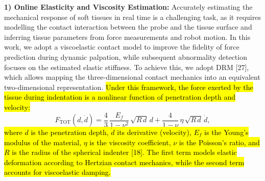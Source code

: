\documentclass[11pt]{article}
\begin{document}
\textbf{1) Online Elasticity and Viscosity Estimation:} Accurately
estimating the mechanical response of soft tissues in real time is a
challenging task, as it requires modelling the contact interaction
between the probe and the tissue surface and inferring tissue
parameters from force measurements and robot motion. In this work,
we adopt a viscoelastic contact model to improve the fidelity of
force prediction during dynamic palpation, while subsequent
abnormality detection focuses on the estimated elastic stiffness.
To achieve this, we adopt DRM [27], which allows mapping the
three-dimensional contact mechanics into an equivalent
two-dimensional representation. \hl{Under this framework, the force
exerted by the tissue during indentation is a nonlinear function of
penetration depth and velocity:}
\begin{equation}
F_{\mathrm{TOT}}(d, \dot{d}) =
\frac{4}{3}\, \frac{E_{f}}{1 - \nu^{2}}\, \sqrt{R\, d}\, d
+ \frac{4}{1 - \nu}\, \eta\, \sqrt{R\, d}\, \dot{d},
\end{equation}
\hl{where $d$ is the penetration depth, $\dot{d}$ its derivative
(velocity), $E_{f}$ is the Young's modulus of the material, $\eta$
is the viscosity coefficient, $\nu$ is the Poisson's ratio, and $R$
is the radius of the spherical indenter [18]. The first term models
elastic deformation according to Hertzian contact mechanics, while
the second term accounts for viscoelastic damping.}
\end{document}
